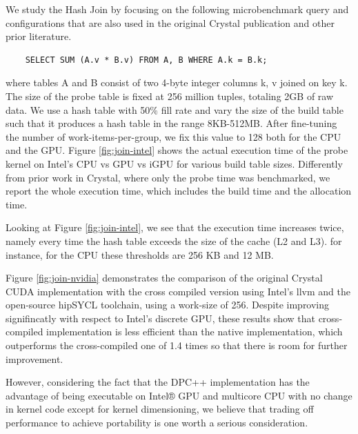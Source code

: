 \documentclass[sigconf, nonacm]{acmart}
\begin{document}
We study the Hash Join by focusing on the following
microbenchmark query and configurations that are also used in the original Crystal publication and other prior literature\cite{crystal}.

\begin{verbatim}
    SELECT SUM (A.v * B.v) FROM A, B WHERE A.k = B.k;
\end{verbatim}
where tables A and B consist of two 4-byte integer columns k, v joined on key k. The size of the probe table is fixed at 256
million tuples, totaling 2GB of raw data. We use a hash table with 50\% fill rate and vary the size of the build table such that it produces a hash table in the range 8KB-512MB. After fine-tuning the number of work-items-per-group, we fix this value to 128 both for the CPU and the GPU. 
Figure \ref{fig:join-intel} shows the actual execution time of the probe kernel on Intel's CPU vs GPU vs iGPU for various build table sizes. Differently from prior work in Crystal, where only the probe time was benchmarked, we report the whole execution time, which includes the build time and the allocation time. 

Looking at Figure \ref{fig:join-intel}, we see that the execution time increases twice, namely every time the hash table exceeds the size of the cache (L2 and L3).  for instance, for the CPU these thresholds are 256 KB and 12 MB.

Figure \ref{fig:join-nvidia} demonstrates the comparison of the original Crystal CUDA implementation with the cross compiled version using Intel's llvm and the open-source hipSYCL toolchain, using a work-size of 256. 
Despite improving signifincatly with respect to Intel's discrete GPU, these results show that cross-compiled implementation is less efficient than the native implementation, which outperforms the cross-compiled one of 1.4 times so that there is room for further improvement.

However, considering the fact that the DPC++ implementation has
the advantage of being executable on Intel® GPU and multicore
CPU with no change in kernel code except for kernel dimensioning, we believe that trading off performance to achieve portability is one worth a serious consideration.
\end{document}
